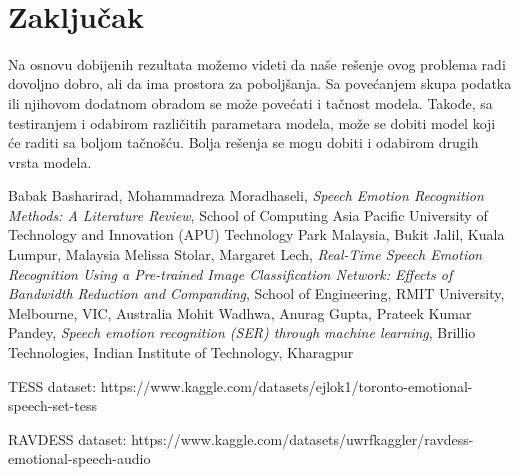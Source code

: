 \documentclass{article}
\begin{document}
\\
\newpage
\section{Zaključak}
Na osnovu dobijenih rezultata možemo videti da naše rešenje ovog problema radi dovoljno dobro, ali da ima prostora za poboljšanja.
Sa povećanjem skupa podatka ili njihovom dodatnom obradom se može povećati i tačnost modela.
Takođe, sa testiranjem i odabirom različitih parametara modela, može se dobiti model koji će raditi sa boljom tačnošću. 
Bolja rešenja se mogu dobiti i odabirom drugih vrsta modela.

\newpage

\begin{thebibliography}{6}

    \bibitem{} Babak Basharirad, Mohammadreza Moradhaseli, \textit{Speech Emotion Recognition Methods: A Literature Review}, School of Computing Asia Pacific University of Technology and Innovation (APU) Technology Park Malaysia, Bukit Jalil, Kuala Lumpur, Malaysia
    \bibitem{} Melissa Stolar, Margaret Lech, \textit{Real-Time Speech Emotion Recognition Using a Pre-trained Image Classification Network: Effects of Bandwidth Reduction and Companding}, School of Engineering, RMIT University, Melbourne, VIC, Australia 
    \bibitem{} Mohit Wadhwa,  Anurag  Gupta, Prateek Kumar Pandey, \textit{Speech emotion recognition (SER) through machine learning}, Brillio Technologies, Indian Institute of Technology, Kharagpur

     TESS dataset:  https://www.kaggle.com/datasets/ejlok1/toronto-emotional-speech-set-tess

     RAVDESS dataset:   https://www.kaggle.com/datasets/uwrfkaggler/ravdess-emotional-speech-audio
\end{thebibliography}
\end{document}
